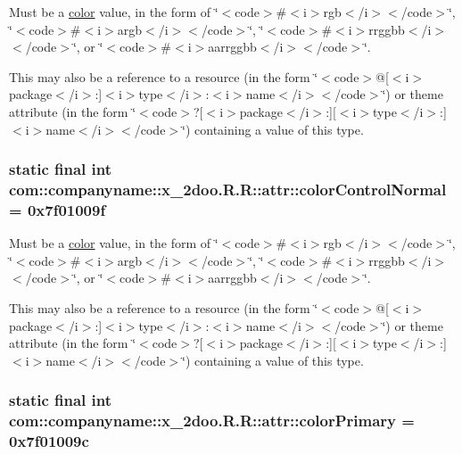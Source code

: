 Must be a \hyperlink{classcom_1_1companyname_1_1x__2doo_1_1_r_1_1color}{color} value, in the form of \char`\"{}$<$code$>$\#$<$i$>$rgb$<$/i$>$$<$/code$>$\char`\"{}, \char`\"{}$<$code$>$\#$<$i$>$argb$<$/i$>$$<$/code$>$\char`\"{}, \char`\"{}$<$code$>$\#$<$i$>$rrggbb$<$/i$>$$<$/code$>$\char`\"{}, or \char`\"{}$<$code$>$\#$<$i$>$aarrggbb$<$/i$>$$<$/code$>$\char`\"{}. 

This may also be a reference to a resource (in the form \char`\"{}$<$code$>$@\mbox{[}$<$i$>$package$<$/i$>$:\mbox{]}$<$i$>$type$<$/i$>$:$<$i$>$name$<$/i$>$$<$/code$>$\char`\"{}) or theme attribute (in the form \char`\"{}$<$code$>$?\mbox{[}$<$i$>$package$<$/i$>$:\mbox{]}\mbox{[}$<$i$>$type$<$/i$>$:\mbox{]}$<$i$>$name$<$/i$>$$<$/code$>$\char`\"{}) containing a value of this type. \hypertarget{classcom_1_1companyname_1_1x__2doo_1_1_r_1_1attr_984b5a46754835de6420fbfc0188980f}{
\subsubsection[{colorControlNormal}]{\setlength{\rightskip}{0pt plus 5cm}static final int com::companyname::x\_\-2doo.R.R::attr::colorControlNormal = 0x7f01009f}}
\label{classcom_1_1companyname_1_1x__2doo_1_1_r_1_1attr_984b5a46754835de6420fbfc0188980f}


Must be a \hyperlink{classcom_1_1companyname_1_1x__2doo_1_1_r_1_1color}{color} value, in the form of \char`\"{}$<$code$>$\#$<$i$>$rgb$<$/i$>$$<$/code$>$\char`\"{}, \char`\"{}$<$code$>$\#$<$i$>$argb$<$/i$>$$<$/code$>$\char`\"{}, \char`\"{}$<$code$>$\#$<$i$>$rrggbb$<$/i$>$$<$/code$>$\char`\"{}, or \char`\"{}$<$code$>$\#$<$i$>$aarrggbb$<$/i$>$$<$/code$>$\char`\"{}. 

This may also be a reference to a resource (in the form \char`\"{}$<$code$>$@\mbox{[}$<$i$>$package$<$/i$>$:\mbox{]}$<$i$>$type$<$/i$>$:$<$i$>$name$<$/i$>$$<$/code$>$\char`\"{}) or theme attribute (in the form \char`\"{}$<$code$>$?\mbox{[}$<$i$>$package$<$/i$>$:\mbox{]}\mbox{[}$<$i$>$type$<$/i$>$:\mbox{]}$<$i$>$name$<$/i$>$$<$/code$>$\char`\"{}) containing a value of this type. \hypertarget{classcom_1_1companyname_1_1x__2doo_1_1_r_1_1attr_0444fdeaecab1522a203ba5b0bc9abfd}{
\subsubsection[{colorPrimary}]{\setlength{\rightskip}{0pt plus 5cm}static final int com::companyname::x\_\-2doo.R.R::attr::colorPrimary = 0x7f01009c}}
\label{classcom_1_1companyname_1_1x__2doo_1_1_r_1_1attr_0444fdeaecab1522a203ba5b0bc9abfd}



